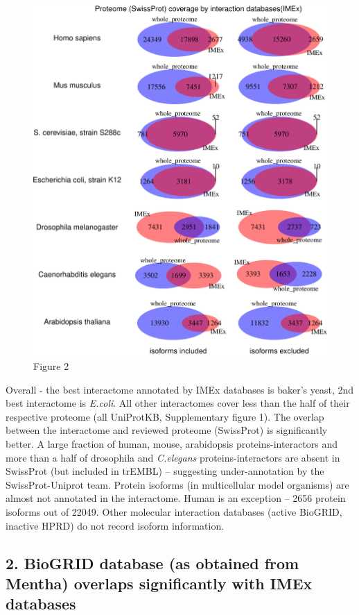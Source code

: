 \documentclass[]{article}
\begin{document}
\begin{figure}[htbp]
\centering
\includegraphics{final_report_files/figure-latex/IMEx_vs_Uniprot_venndiagram-1.pdf}
\caption{Figure 2}
\end{figure}

Overall - the best interactome annotated by IMEx databases is baker's
yeast, 2nd best interactome is \emph{E.coli}. All other interactomes
cover less than the half of their respective proteome (all UniProtKB,
Supplementary figure 1). The overlap between the interactome and
reviewed proteome (SwissProt) is significantly better. A large fraction
of human, mouse, arabidopsis proteins-interactors and more than a half
of drosophila and \emph{C.elegans} proteins-interactors are absent in
SwissProt (but included in trEMBL) -- suggesting under-annotation by the
SwissProt-Uniprot team. Protein isoforms (in multicellular model
organisms) are almost not annotated in the interactome. Human is an
exception -- 2656 protein isoforms out of 22049. Other molecular
interaction databases (active BioGRID, inactive HPRD) do not record
isoform information.

\subsection{2. BioGRID database (as obtained from Mentha) overlaps
significantly with IMEx
databases}\label{biogrid-database-as-obtained-from-mentha-overlaps-significantly-with-imex-databases}
\end{document}
